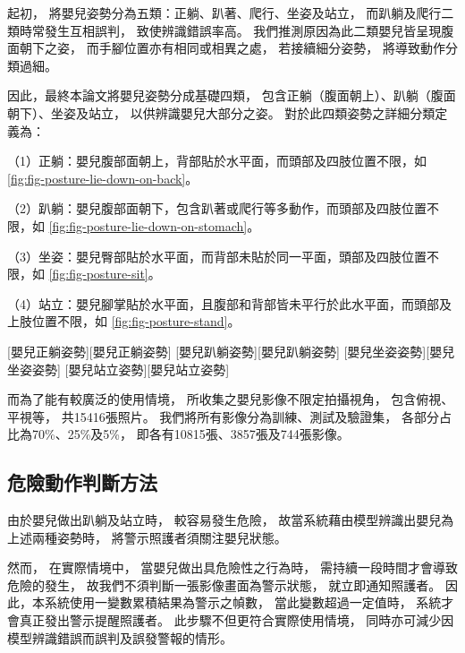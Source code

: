 \documentclass[class=NCU_thesis, crop=false]{standalone}
\begin{document}
起初，
將嬰兒姿勢分為五類：正躺、趴著、爬行、坐姿及站立，
而趴躺及爬行二類時常發生互相誤判，
致使辨識錯誤率高。
我們推測原因為此二類嬰兒皆呈現腹面朝下之姿，
而手腳位置亦有相同或相異之處，
若接續細分姿勢，
將導致動作分類過細。

因此，最終本論文將嬰兒姿勢分成基礎四類，
包含正躺（腹面朝上）、趴躺（腹面朝下）、坐姿及站立，
以供辨識嬰兒大部分之姿。
對於此四類姿勢之詳細分類定義為：

（1）正躺：嬰兒腹部面朝上，背部貼於水平面，而頭部及四肢位置不限，如
\cref{fig:fig-posture-lie-down-on-back}。

（2）趴躺：嬰兒腹部面朝下，包含趴著或爬行等多動作，而頭部及四肢位置不限，如
\cref{fig:fig-posture-lie-down-on-stomach}。

（3）坐姿：嬰兒臀部貼於水平面，而背部未貼於同一平面，頭部及四肢位置不限，如
\cref{fig:fig-posture-sit}。

（4）站立：嬰兒腳掌貼於水平面，且腹部和背部皆未平行於此水平面，而頭部及上肢位置不限，如
\cref{fig:fig-posture-stand}。

[嬰兒正躺姿勢][嬰兒正躺姿勢]
[嬰兒趴躺姿勢][嬰兒趴躺姿勢]
[嬰兒坐姿姿勢][嬰兒坐姿姿勢]
[嬰兒站立姿勢][嬰兒站立姿勢]

而為了能有較廣泛的使用情境，
所收集之嬰兒影像不限定拍攝視角，
包含俯視、平視等，
共15416張照片。
我們將所有影像分為訓練、測試及驗證集，
各部分占比為70\%、25\%及5\%，
即各有10815張、3857張及744張影像。

\subsection{危險動作判斷方法}
由於嬰兒做出趴躺及站立時，
較容易發生危險，
故當系統藉由模型辨識出嬰兒為上述兩種姿勢時，
將警示照護者須關注嬰兒狀態。

然而，
在實際情境中，
當嬰兒做出具危險性之行為時，
需持續一段時間才會導致危險的發生，
故我們不須判斷一張影像畫面為警示狀態，
就立即通知照護者。
因此，本系統使用一變數累積結果為警示之幀數，
當此變數超過一定值時，
系統才會真正發出警示提醒照護者。
此步驟不但更符合實際使用情境，
同時亦可減少因模型辨識錯誤而誤判及誤發警報的情形。
\end{document}
